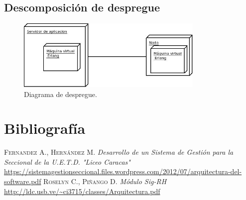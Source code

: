 \documentclass[DIV=calc,paper=a4,fontsize=11pt,onecolumn]{scrartcl}	 %
\begin{document}
\subsection{Descomposición de despregue}

\begin{figure}[h]
\centering
\includegraphics[width=0.8\textwidth]{./figuras/Diagrama7.jpeg}
\caption{Diagrama de despregue.}
\label{fig:despregue}
\end{figure}
\section{Bibliografía}
\begin{thebibliography}{2}
 \textsc{Fernandez A., Hernández M.}
\textit{Desarrollo de un Sistema de Gestión para la Seccional de la U.E.T.D. "Liceo Caracas"}
\url{https://sistemagestionseccional.files.wordpress.com/2012/07/arquitectura-del-software.pdf}
 \textsc{Roselyn C., Piñango D.}
\textit{Módulo Sig-RH}
\url{http://ldc.usb.ve/~ci3715/classes/Arquitectura.pdf}
\end{thebibliography}
\end{document}
